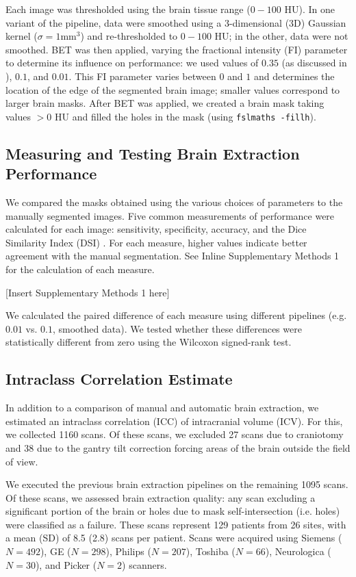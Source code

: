 \documentclass{elsarticle}\usepackage[]{graphicx}\usepackage[]{color}
\begin{document}
Each image was thresholded using the brain tissue range ($0-100$ HU).  In one variant of the pipeline, data were smoothed using a 3-dimensional (3D) Gaussian kernel ($\sigma=1$mm$^3$) and re-thresholded to $0-100$ HU; in the other, data were not smoothed.  BET was then applied, varying the fractional intensity (FI) parameter to determine its influence on performance: we used values of $0.35$ (as discussed in \citet{rorden_age-specific_2012}), $0.1$, and $0.01$.  This FI parameter varies between $0$ and $1$ and determines the location of the edge of the segmented brain image; smaller values correspond to larger brain masks. After BET was applied, we created a brain mask taking values $> 0$ HU and filled the holes in the mask (using \verb|fslmaths -fillh|).  


\subsection{Measuring and Testing Brain Extraction Performance}
We compared the masks obtained using the various choices of parameters to the manually segmented images.  Five common measurements of performance were calculated for each image: sensitivity, specificity, accuracy, and the Dice Similarity Index (DSI) \citep{dice_measures_1945}.  For each measure, higher values indicate better agreement with the manual segmentation.  See Inline Supplementary Methods 1 for the calculation of each measure.

[Insert Supplementary Methods 1 here]

We calculated the paired difference of each measure using different pipelines (e.g. $0.01$ vs. $0.1$, smoothed data).  We tested whether these differences were statistically different from zero using the Wilcoxon signed-rank test.



\subsection{Intraclass Correlation Estimate}
In addition to a comparison of manual and automatic brain extraction, we estimated an intraclass correlation (ICC) of intracranial volume (ICV).  For this, we collected 1160 scans.  Of these scans, we excluded 27 scans due to craniotomy and 38 due to the gantry tilt correction forcing areas of the brain outside the field of view.   

We executed the previous brain extraction pipelines on the remaining 1095 scans.  Of these scans, we assessed brain extraction quality: any scan excluding a significant portion of the brain or holes due to mask self-intersection (i.e. holes) were classified as a failure.  These scans represent 129 patients from 26 sites, with a mean (SD) of 8.5 (2.8) scans per patient.  Scans were acquired using Siemens ($N=492$), GE ($N=298$), Philips ($N=207$), Toshiba ($N=66$), Neurologica ($N=30$), and Picker ($N=2$) scanners.
\end{document}
